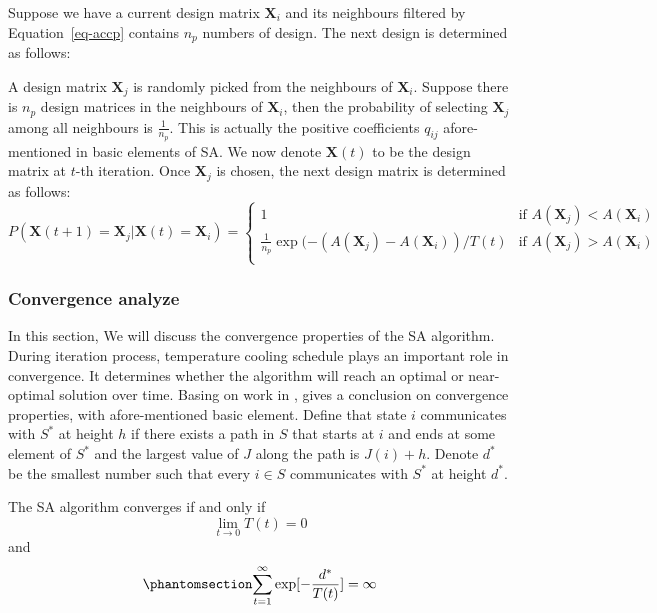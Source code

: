 \documentclass[
  a4paper,
  oneside,
  openany,
  12pt,
  onecolumn]{book}
\theoremstyle{plain}
\theoremstyle{definition}
\theoremstyle{remark}
\begin{document}
Suppose we have a current design matrix \(\boldsymbol{X}_i\) and its
neighbours filtered by Equation~\ref{eq-accp} contains \(n_p\) numbers
of design. The next design is determined as follows:

A design matrix \(\boldsymbol{X}_j\) is randomly picked from the
neighbours of \(\boldsymbol{X}_i\). Suppose there is \(n_p\) design
matrices in the neighbours of \(\boldsymbol{X}_i\), then the probability
of selecting \(\boldsymbol{X}_j\) among all neighbours is
\(\frac{1}{n_p}\). This is actually the positive coefficients \(q_{ij}\)
afore-mentioned in basic elements of SA. We now denote
\(\boldsymbol{X}(t)\) to be the design matrix at \(t\)-th iteration.
Once \(\boldsymbol{X}_j\) is chosen, the next design matrix is
determined as follows: \[
P(\boldsymbol{X}(t+1)=\boldsymbol{X}_j|\boldsymbol{X}(t)=\boldsymbol{X}_i)
=\begin{cases}
1 & \text{if } A(\boldsymbol{X}_j)<A(\boldsymbol{X}_i) \\
\frac{1}{n_p}\exp(-(A(\boldsymbol{X}_j)-A(\boldsymbol{X}_i))/T(t) & \text{if } A(\boldsymbol{X}_j)>A(\boldsymbol{X}_i)\\
\end{cases}
\]

\subsubsection{Convergence analyze}\label{convergence-analyze}

In this section, We will discuss the convergence properties of the SA
algorithm. During iteration process, temperature cooling schedule plays
an important role in convergence. It determines whether the algorithm
will reach an optimal or near-optimal solution over time. Basing on work
in \citet{sasaki1988time}, \citet{bertsimas1993simulated} gives a
conclusion on convergence properties, with afore-mentioned basic
element. Define that state \(i\) communicates with \(S^*\) at height
\(h\) if there exists a path in \(S\) that starts at \(i\) and ends at
some element of \(S^*\) and the largest value of \(J\) along the path is
\(J(i)+h\). Denote \(d^*\) be the smallest number such that every
\(i \in S\) communicates with \(S^*\) at height \(d^*\).

The SA algorithm converges if and only if \[
\lim_{t\to 0} T(t)=0
\] and \begin{equation}\phantomsection\label{eq-covcon}{
\sum_{t=1}^{\infty} \exp[-\frac{d^*}{T(t)}]=\infty
}\end{equation}
\end{document}
